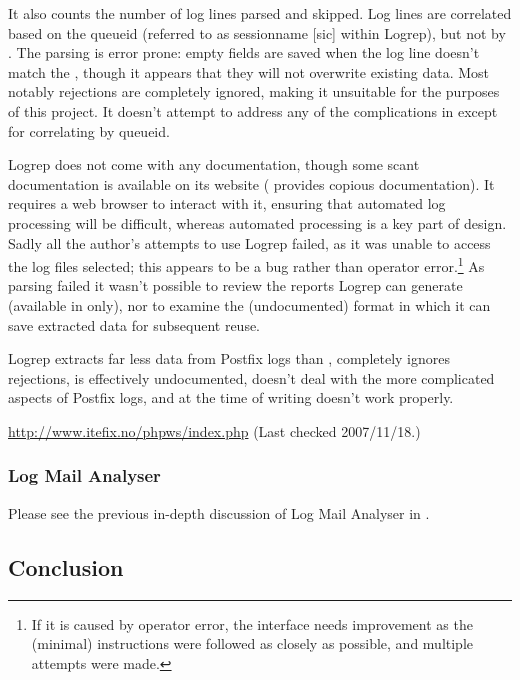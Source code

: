 It also counts the number of log lines parsed and skipped.  Log lines are
correlated based on the queueid (referred to as sessionname [sic] within
Logrep), but not by \pid{}.  The parsing is error prone: empty fields are
saved when the log line doesn't match the \regex{}, though it appears that
they will not overwrite existing data.  Most notably rejections are
completely ignored, making it unsuitable for the purposes of this project.
It doesn't attempt to address any of the complications in
  except for
correlating by queueid.

Logrep does not come with any documentation, though some scant
documentation is available on its website (\parsername{} provides copious
documentation).  It requires a web browser to interact with it, ensuring
that automated log processing will be difficult, whereas automated
processing is a key part of \parsernames{} design.  Sadly all the author's
attempts to use Logrep failed, as it was unable to access the log files
selected; this appears to be a bug rather than operator error.\footnote{If
it is caused by operator error, the interface needs improvement as the
(minimal) instructions were followed as closely as possible, and multiple
attempts were made.}  As parsing failed it wasn't possible to review the
reports Logrep can generate (available in \HTML{} only), nor to examine the
(undocumented) format in which it can save extracted data for subsequent
reuse.

Logrep extracts far less data from Postfix logs than \parsername{},
completely ignores rejections, is effectively undocumented, doesn't deal
with the more complicated aspects of Postfix logs, and at the time of
writing doesn't work properly.

\url{http://www.itefix.no/phpws/index.php} \newline (Last checked
2007/11/18.)

\subsubsection{Log Mail Analyser}

Please see the previous in-depth discussion of Log Mail Analyser in
.


\subsection{Conclusion}

